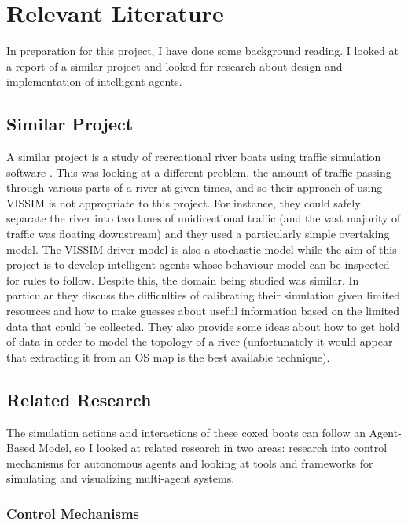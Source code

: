 \chapter{Relevant Literature}

In preparation for this project, I have done some background
reading. I looked at a report of a similar project and looked for research about design and implementation of intelligent agents. 

\section{Similar Project}

A similar project is a study of recreational river boats using
traffic simulation software \cite{Lowry2011}. This was looking at a
different problem, the amount of traffic passing through various parts
of a river at given times, and so their approach of using VISSIM is
not appropriate to this project. For instance, they could safely
separate the river into two lanes of unidirectional traffic (and the
vast majority of traffic was floating downstream) and they used a
particularly simple overtaking model. The VISSIM driver model is also
a stochastic model while the aim of this project is to develop
intelligent agents whose behaviour model can be inspected for rules to
follow. Despite this, the domain being studied was
similar. In particular they discuss the difficulties of calibrating
their simulation given limited resources and how to make guesses
about useful information based on the limited data that could be
collected. They also provide some ideas about how to get hold of data
in order to model the topology of a river (unfortunately it would
appear that extracting it from an OS map is the best available
technique).

\section{Related Research}

The simulation actions and interactions of these coxed boats can follow an Agent-Based Model, so I looked at related research in two areas: research into control mechanisms for
autonomous agents and looking at tools and frameworks for simulating
and visualizing multi-agent systems.

\subsection{Control Mechanisms}

